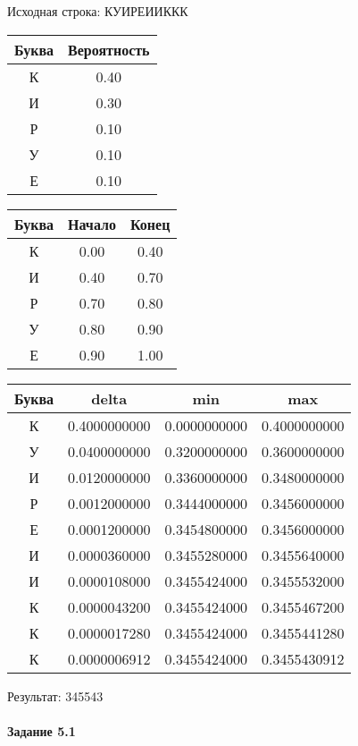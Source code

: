 \documentclass[a4paper, 12pt]{article}
\begin{document}
Исходная строка: КУИРЕИИККК\
\begin{center}
 \begin{tabular}{ |c|c| } 
  \hline
     Буква & Вероятность \\ \hline
К & 0.40\\\hline
И & 0.30\\\hline
Р & 0.10\\\hline
У & 0.10\\\hline
Е & 0.10
\\ \hline \end{tabular}
\end{center}
\begin{center}
 \begin{tabular}{ |c|c|c| } 
  \hline
     Буква & Начало & Конец \\ \hline
К & 0.00 & 0.40\\\hline
И & 0.40 & 0.70\\\hline
Р & 0.70 & 0.80\\\hline
У & 0.80 & 0.90\\\hline
Е & 0.90 & 1.00
\\ \hline \end{tabular}
\end{center}
\begin{center}
 \begin{tabular}{ |c|c|c|c| } 
  \hline
     Буква & delta & min & max \\ \hline
К & 0.4000000000 & 0.0000000000 & 0.4000000000\\\hline
У & 0.0400000000 & 0.3200000000 & 0.3600000000\\\hline
И & 0.0120000000 & 0.3360000000 & 0.3480000000\\\hline
Р & 0.0012000000 & 0.3444000000 & 0.3456000000\\\hline
Е & 0.0001200000 & 0.3454800000 & 0.3456000000\\\hline
И & 0.0000360000 & 0.3455280000 & 0.3455640000\\\hline
И & 0.0000108000 & 0.3455424000 & 0.3455532000\\\hline
К & 0.0000043200 & 0.3455424000 & 0.3455467200\\\hline
К & 0.0000017280 & 0.3455424000 & 0.3455441280\\\hline
К & 0.0000006912 & 0.3455424000 & 0.3455430912
\\ \hline \end{tabular}
\end{center}
Результат: 345543
\pagebreak
\paragraph{Задание 5.1}
\end{document}

